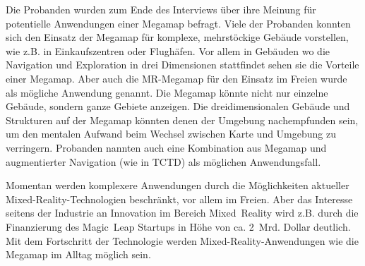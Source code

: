 Die Probanden wurden zum Ende des Interviews über ihre Meinung für potentielle Anwendungen einer Megamap befragt.
Viele der Probanden konnten sich den Einsatz der Megamap für komplexe, mehrstöckige Gebäude vorstellen, wie z.B. in Einkaufszentren oder Flughäfen.
Vor allem in Gebäuden wo die Navigation und Exploration in drei Dimensionen stattfindet sehen sie die Vorteile einer Megamap.
Aber auch die MR-Megamap für den Einsatz im Freien wurde als mögliche Anwendung genannt.
Die Megamap könnte nicht nur einzelne Gebäude, sondern ganze Gebiete anzeigen.
Die dreidimensionalen Gebäude und Strukturen auf der Megamap könnten denen der Umgebung nachempfunden sein, um den mentalen Aufwand beim Wechsel zwischen Karte und Umgebung zu verringern.
Probanden nannten auch eine Kombination aus Megamap und augmentierter Navigation (wie in TCTD) als möglichen Anwendungsfall.

Momentan werden komplexere Anwendungen durch die Möglichkeiten aktueller Mixed-Reality-Technologien beschränkt, vor allem im Freien.
Aber das Interesse seitens der Industrie an Innovation im Bereich Mixed~Reality wird z.B. durch die Finanzierung des Magic~Leap Startups in Höhe von ca. 2~Mrd. Dollar \parencite{Machkovech2017} deutlich.
Mit dem Fortschritt der Technologie werden Mixed-Reality-Anwendungen wie die Megamap im Alltag möglich sein.


%
\cleardoublepage
